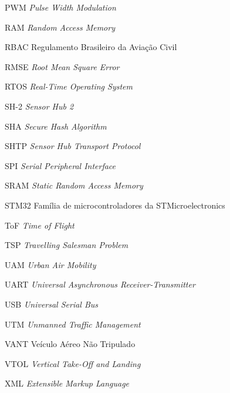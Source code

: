 \begin{siglas}
    \item[PWM] \textit{Pulse Width Modulation}
    \item[RAM] \textit{Random Access Memory}
    \item[RBAC] Regulamento Brasileiro da Aviação Civil
    \item[RMSE] \textit{Root Mean Square Error}
    \item[RTOS] \textit{Real-Time Operating System}
    \item[SH-2] \textit{Sensor Hub 2}
    \item[SHA] \textit{Secure Hash Algorithm}
    \item[SHTP] \textit{Sensor Hub Transport Protocol}
    \item[SPI] \textit{Serial Peripheral Interface}
    \item[SRAM] \textit{Static Random Access Memory}
    \item[STM32] Família de microcontroladores da STMicroelectronics
    \item[ToF] \textit{Time of Flight}
    \item[TSP] \textit{Travelling Salesman Problem}
    \item[UAM] \textit{Urban Air Mobility}
    \item[UART] \textit{Universal Asynchronous Receiver-Transmitter}
    \item[USB] \textit{Universal Serial Bus}
    \item[UTM] \textit{Unmanned Traffic Management}
    \item[VANT] Veículo Aéreo Não Tripulado
    \item[VTOL] \textit{Vertical Take-Off and Landing}
    \item[XML] \textit{Extensible Markup Language}
\end{siglas}
